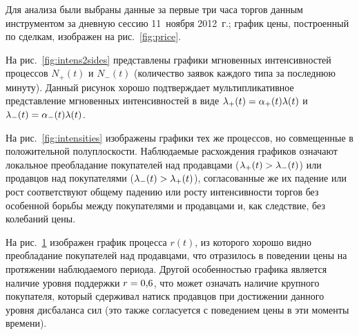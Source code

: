 \begin{multicols}{2}

Для анализа были выбраны данные за первые три часа торгов данным
инструментом за дневную сессию 11~ноября 2012~г.; график цены,
постро\-енный по сделкам, изображен на рис.~\ref{fig:price}.



На рис.~\ref{fig:intens2sides} представлены графики мгновенных
интенсивностей процессов $N_+(t)$ и $N_-(t)$ (количество заявок
каждого типа за последнюю минуту). Данный рисунок хорошо
подтверждает мультипликативное представление мгновенных
интенсивностей в виде $\lambda_+(t) \hm= \alpha_+(t) \lambda(t)$ и
$\lambda_-(t) \hm= \alpha_-(t) \lambda(t)$.


На рис.~\ref{fig:intensities} изображены графики тех же процессов,
но совмещенные в положительной полуплоскости. Наблюдаемые
расхождения графиков означают локальное преобладание покупателей над
продавцами ($\lambda_+(t) \hm> \lambda_-(t)$) или продавцов над
покупателями ($\lambda_-(t) \hm> \lambda_+(t)$), согласованные же их
падение или рост соответствуют общему падению или росту
интенсивности торгов без особенной борьбы между покупателями и
продавцами и, как следствие, без колебаний цены.



На рис.~\ref{fig:intratio} изображен график процесса $r(t)$, из
которого хорошо видно преобладание покупателей над продавцами, что
отразилось в поведении цены на протяжении наблюдаемого периода.
Другой особенностью графика является наличие уровня поддержки $r\hm = 0{,}6$, 
что может означать наличие крупного покупателя, который
сдерживал натиск продавцов при достижении данного уровня дисбаланса
сил (это также согласуется с поведением цены в эти моменты времени).

\end{multicols}

\begin{figure} %
\vspace*{1pt}
 \begin{center}
 \mbox{%
 \epsfxsize=112.55mm
 }
 \end{center}
 \vspace*{-9pt}
\label{fig:intensities}
\vspace*{12pt}
 \begin{center}
 \mbox{%
 \epsfxsize=111.303mm
 }
 \end{center}
 \vspace*{-9pt}
\label{fig:intratio}
\end{figure}

